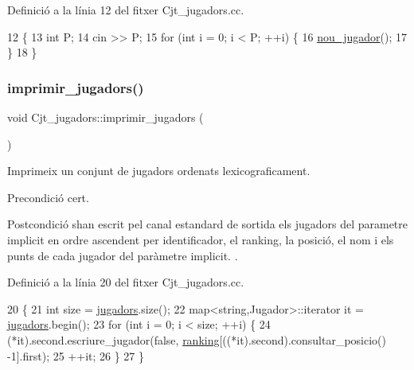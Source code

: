 Definició a la línia 12 del fitxer Cjt\+\_\+jugadors.\+cc.


\begin{DoxyCode}
12                                    \{
13     \textcolor{keywordtype}{int} P;
14     cin >> P;
15     \textcolor{keywordflow}{for} (\textcolor{keywordtype}{int} i = 0; i < P; ++i) \{
16         \mbox{\hyperlink{class_cjt__jugadors_abc12f64a28c23ba5bd1e94814476de6e}{nou\_jugador}}();  
17     \}
18 \}
\end{DoxyCode}
\mbox{\label{class_cjt__jugadors_a9821d65fda187cb5983d98e4e86fc073}} 
\subsubsection{\texorpdfstring{imprimir\+\_\+jugadors()}{imprimir\_jugadors()}}
{\footnotesize\ttfamily void Cjt\+\_\+jugadors\+::imprimir\+\_\+jugadors (\begin{DoxyParamCaption}{ }\end{DoxyParamCaption})}



Imprimeix un conjunt de jugadors ordenats lexicograficament. 

\begin{DoxyPrecond}{Precondició}
cert. 
\end{DoxyPrecond}
\begin{DoxyPostcond}{Postcondició}
s\textquotesingle{}han escrit pel canal estandard de sortida els jugadors del parametre implicit en ordre ascendent per identificador, el ranking, la posició, el nom i els punts de cada jugador del paràmetre implicit. . 
\end{DoxyPostcond}


Definició a la línia 20 del fitxer Cjt\+\_\+jugadors.\+cc.


\begin{DoxyCode}
20                                      \{
21     \textcolor{keywordtype}{int} size = \mbox{\hyperlink{class_cjt__jugadors_a9a7fd899cca7f3c126120c8e7b4719d4}{jugadors}}.size();
22     map<string,Jugador>::iterator it = \mbox{\hyperlink{class_cjt__jugadors_a9a7fd899cca7f3c126120c8e7b4719d4}{jugadors}}.begin();
23     \textcolor{keywordflow}{for} (\textcolor{keywordtype}{int} i = 0; i < size; ++i) \{
24         (*it).second.escriure\_jugador(\textcolor{keyword}{false}, \mbox{\hyperlink{class_cjt__jugadors_af9f7e71820fb657bf489ce72a31e8034}{ranking}}[((*it).second).consultar\_posicio() -1].first);
25         ++it;
26     \}
27 \}
\end{DoxyCode}
\mbox{\label{class_cjt__jugadors_a63581fdbdfaba9aeb5f0b3b466160902}} 

